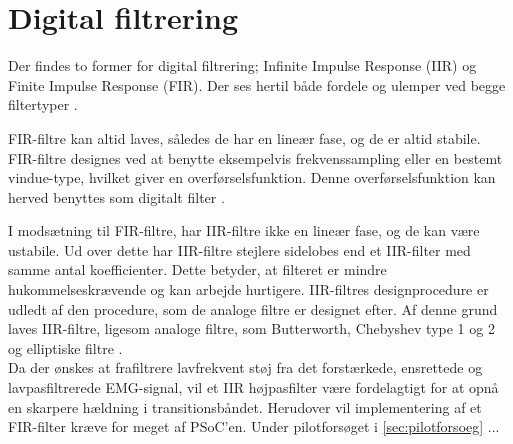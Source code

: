 \section{Digital filtrering}

Der findes to former for digital filtrering; Infinite Impulse Response (IIR) og Finite Impulse Response (FIR). Der ses hertil både fordele og ulemper ved begge filtertyper \citep{blandford2012}.

FIR-filtre kan altid laves, således de har en lineær fase, og de er altid stabile. FIR-filtre designes ved at benytte eksempelvis frekvenssampling eller en bestemt vindue-type, hvilket giver en overførselsfunktion. Denne overførselsfunktion kan herved benyttes som digitalt filter \citep{blandford2012}. 

I modsætning til FIR-filtre, har IIR-filtre ikke en lineær fase, og de kan være ustabile. Ud over dette har IIR-filtre stejlere sidelobes end et IIR-filter med samme antal koefficienter. Dette betyder, at filteret er mindre hukommelseskrævende og kan arbejde hurtigere. IIR-filtres designprocedure er udledt af den procedure, som de analoge filtre er designet efter. Af denne grund laves IIR-filtre, ligesom analoge filtre, som Butterworth, Chebyshev type 1 og 2 og elliptiske filtre \citep{blandford2012}. 
\\

Da der ønskes at frafiltrere lavfrekvent støj fra det forstærkede, ensrettede og lavpasfiltrerede EMG-signal, vil et IIR højpasfilter være fordelagtigt for at opnå en skarpere hældning i transitionsbåndet. Herudover vil implementering af et FIR-filter kræve for meget af PSoC'en. Under pilotforsøget i \autoref{sec:pilotforsoeg} ...

